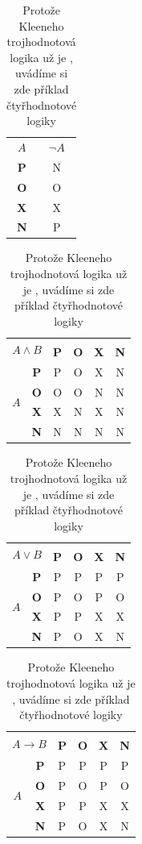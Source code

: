 \documentclass[a4paper, 11pt]{article}
\begin{document}
\begin{table}[h] 
\centering 
\begin{tabular}{|>{\bfseries}c|c|}
\hline 
    {$A$} & {$\neg A$} \\\cline{1-2}
    P &  N\\\cline{1-2}
    O &  O\\\cline{1-2}
    X &  X\\\cline{1-2}
    N &  P\\\cline{1-2}
\end{tabular}
\begin{tabular}{|c|>{\bfseries}c|c|c|c|c|}
\hline 
    \multicolumn{2}{|c|}{\multirow{2}{*}{$A \land B$}}&\multicolumn{4}{c|}{$B$}\\\cline{3-6}
 \multicolumn{2}{|c|}{} & \textbf{P} & \textbf{O} & \textbf{X} & \textbf{N} \\ 
    \hline 
\multirow{4}{*}{$A$}
    & P  &  P & O & X & N  \\\cline{2-6} 
    & O  &  O & O & N & N  \\\cline{2-6}
    & X  &  X & N & X & N  \\\cline{2-6}
    & N  &  N & N & N & N  \\\cline{2-6}
  \hline 
\end{tabular}
\begin{tabular}{|c|>{\bfseries}c|c|c|c|c|}
\hline 
    \multicolumn{2}{|c|}{\multirow{2}{*}{$A \lor B$}}&\multicolumn{4}{c|}{$B$}\\\cline{3-6}
 \multicolumn{2}{|c|}{} & \textbf{P} & \textbf{O} & \textbf{X} & \textbf{N} \\ 
    \hline 
\multirow{4}{*}{$A$}
    & P  &  P & P & P & P  \\\cline{2-6} 
    & O  &  P & O & P & O  \\\cline{2-6}
    & X  &  P & P & X & X  \\\cline{2-6}
    & N  &  P & O & X & N  \\\cline{2-6}
  \hline 
\end{tabular}
\begin{tabular}{|c|>{\bfseries}c|c|c|c|c|}
\hline 
    \multicolumn{2}{|c|}{\multirow{2}{*}{$A \to B$}}&\multicolumn{4}{c|}{$B$}\\\cline{3-6}
 \multicolumn{2}{|c|}{} & \textbf{P} & \textbf{O} & \textbf{X} & \textbf{N} \\ 
    \hline 
\multirow{4}{*}{$A$}
    & P  &  P & P & P & P  \\\cline{2-6} 
    & O  &  P & O & P & O  \\\cline{2-6}
    & X  &  P & P & X & X  \\\cline{2-6}
    & N  &  P & O & X & N  \\\cline{2-6}
  \hline 
\end{tabular}
\caption{\label{tab:tab2}Protože Kleeneho trojhodnotová logika už je , uvádíme si zde příklad čtyřhodnotové logiky}
\end{table}
\bigskip
\pagebreak
\end{document}

